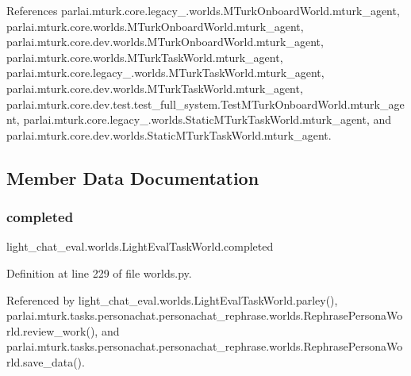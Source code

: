 References parlai.\+mturk.\+core.\+legacy\+\_.\+worlds.\+M\+Turk\+Onboard\+World.\+mturk\+\_\+agent, parlai.\+mturk.\+core.\+worlds.\+M\+Turk\+Onboard\+World.\+mturk\+\_\+agent, parlai.\+mturk.\+core.\+dev.\+worlds.\+M\+Turk\+Onboard\+World.\+mturk\+\_\+agent, parlai.\+mturk.\+core.\+worlds.\+M\+Turk\+Task\+World.\+mturk\+\_\+agent, parlai.\+mturk.\+core.\+legacy\+\_.\+worlds.\+M\+Turk\+Task\+World.\+mturk\+\_\+agent, parlai.\+mturk.\+core.\+dev.\+worlds.\+M\+Turk\+Task\+World.\+mturk\+\_\+agent, parlai.\+mturk.\+core.\+dev.\+test.\+test\+\_\+full\+\_\+system.\+Test\+M\+Turk\+Onboard\+World.\+mturk\+\_\+agent, parlai.\+mturk.\+core.\+legacy\+\_.\+worlds.\+Static\+M\+Turk\+Task\+World.\+mturk\+\_\+agent, and parlai.\+mturk.\+core.\+dev.\+worlds.\+Static\+M\+Turk\+Task\+World.\+mturk\+\_\+agent.



\subsection{Member Data Documentation}
\mbox{\label{classlight__chat__eval_1_1worlds_1_1LightEvalTaskWorld_a1deec2abb5e96799ec49097721586013}} 
\subsubsection{\texorpdfstring{completed}{completed}}
{\footnotesize\ttfamily light\+\_\+chat\+\_\+eval.\+worlds.\+Light\+Eval\+Task\+World.\+completed}



Definition at line 229 of file worlds.\+py.



Referenced by light\+\_\+chat\+\_\+eval.\+worlds.\+Light\+Eval\+Task\+World.\+parley(), parlai.\+mturk.\+tasks.\+personachat.\+personachat\+\_\+rephrase.\+worlds.\+Rephrase\+Persona\+World.\+review\+\_\+work(), and parlai.\+mturk.\+tasks.\+personachat.\+personachat\+\_\+rephrase.\+worlds.\+Rephrase\+Persona\+World.\+save\+\_\+data().

\mbox{\label{classlight__chat__eval_1_1worlds_1_1LightEvalTaskWorld_a89359a6fdc961c97b5859980b3790540}} 
